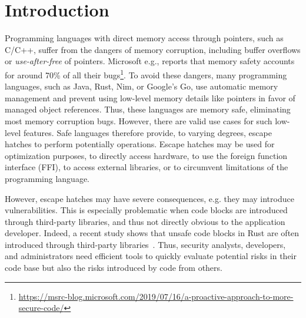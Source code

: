 \section{Introduction}
\label{sec:intro}

Programming languages with direct memory access through pointers, such as C/C++, suffer from the dangers of memory corruption, including buffer overflows \cite{alnaeli2017, larochelle2001} or \textit{use-after-free} of pointers.
Microsoft e.g., reports that memory safety accounts for around 70\% of all their bugs\footnote{\url{https://msrc-blog.microsoft.com/2019/07/16/a-proactive-approach-to-more-secure-code/}}. 
To avoid these dangers, many programming languages, such as Java, Rust, Nim, or Google's Go, use automatic memory management and prevent using low-level memory details like pointers in favor of managed object references.
Thus, these languages are memory safe, eliminating most memory corruption bugs. 
However, there are valid use cases for such low-level features.
%
%
%
Safe languages therefore provide, to varying degrees, escape hatches to perform potentially \unsafe{} operations.
Escape hatches may be used for optimization purposes, to directly access hardware, to use the foreign function interface (FFI), to access external libraries, or to circumvent limitations of the programming language. 

However, escape hatches may have severe consequences, e.g. they may introduce vulnerabilities.
This is especially problematic when \unsafe{} code blocks are introduced through third-party libraries, and thus not directly obvious to the application developer. 
Indeed, a recent study shows that unsafe code blocks in Rust are often introduced through third-party libraries~\cite{evans2020}. 
Thus, security analysts, developers, and administrators need efficient tools to quickly evaluate potential risks in their code base but also the risks introduced by code from others.


